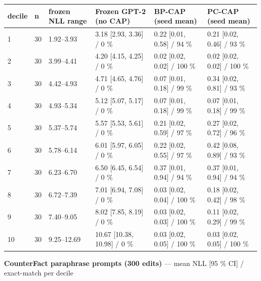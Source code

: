\documentclass[10pt,a4paper]{article}
\begin{document}
\begin{center}\footnotesize
\begin{tabularx}{\textwidth}{@{}p{}XXXXX@{}}
\toprule
decile & n & frozen NLL range & Frozen GPT-2 (no CAP) & BP-CAP (seed mean) & PC-CAP (seed mean) \\ \midrule
1 & 30 & 1.92–3.93 & 3.18 [2.93, 3.36] / 0 \% & 0.22 [0.01, 0.58] / 94 \% & 0.21 [0.02, 0.46] / 93 \% \\
2 & 30 & 3.99–4.41 & 4.20 [4.15, 4.25] / 0 \% & 0.02 [0.02, 0.02] / 100 \% & 0.02 [0.02, 0.02] / 100 \% \\
3 & 30 & 4.42–4.93 & 4.71 [4.65, 4.76] / 0 \% & 0.07 [0.01, 0.18] / 99 \% & 0.34 [0.02, 0.81] / 93 \% \\
4 & 30 & 4.93–5.34 & 5.12 [5.07, 5.17] / 0 \% & 0.07 [0.01, 0.18] / 99 \% & 0.07 [0.01, 0.18] / 99 \% \\
5 & 30 & 5.37–5.74 & 5.57 [5.53, 5.61] / 0 \% & 0.21 [0.02, 0.59] / 97 \% & 0.27 [0.02, 0.72] / 96 \% \\
6 & 30 & 5.78–6.14 & 6.01 [5.97, 6.05] / 0 \% & 0.22 [0.02, 0.55] / 97 \% & 0.42 [0.08, 0.89] / 93 \% \\
7 & 30 & 6.23–6.70 & 6.50 [6.45, 6.54] / 0 \% & 0.37 [0.01, 0.94] / 94 \% & 0.37 [0.01, 0.94] / 94 \% \\
8 & 30 & 6.72–7.39 & 7.01 [6.94, 7.08] / 0 \% & 0.03 [0.02, 0.04] / 100 \% & 0.18 [0.02, 0.42] / 98 \% \\
9 & 30 & 7.40–9.05 & 8.02 [7.85, 8.19] / 0 \% & 0.03 [0.02, 0.03] / 100 \% & 0.11 [0.02, 0.29] / 99 \% \\
10 & 30 & 9.25–12.69 & 10.67 [10.38, 10.98] / 0 \% & 0.03 [0.02, 0.05] / 100 \% & 0.03 [0.02, 0.05] / 100 \% \\
\bottomrule
\end{tabularx}
\end{center}



\textbf{CounterFact paraphrase prompts (300 edits)} — mean NLL [95 \% CI] / exact-match per decile
\end{document}
